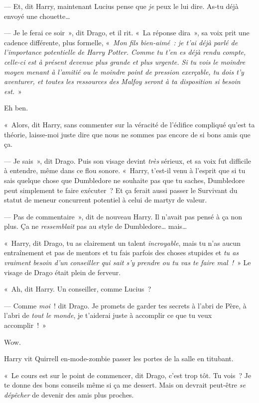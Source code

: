 --- Et, dit Harry, maintenant Lucius pense que \emph{je} peux le lui dire. As-tu déjà envoyé une chouette…

--- Je le ferai ce soir~», dit Drago, et il rit. «~La réponse dira~», sa voix prit une cadence différente, plus formelle, «~\emph{Mon fils bien-aimé~: je t'ai déjà parlé de l'importance potentielle de Harry Potter. Comme tu t'en es déjà rendu compte, celle-ci est à présent devenue plus grande et plus urgente. Si tu vois le moindre moyen menant à l'amitié ou le moindre point de pression exerçable, tu dois t'y aventurer, et toutes les ressources des Malfoy seront à ta disposition si besoin est.}~»

Eh ben.

«~Alors, dit Harry, sans commenter sur la véracité de l'édifice compliqué qu'est ta théorie, laisse-moi juste dire que nous ne sommes pas encore de si bons amis que ça.

--- Je sais~», dit Drago. Puis son visage devint \emph{très} sérieux, et sa voix fut difficile à entendre, même dans ce flou sonore. «~Harry, t'est-il venu à l'esprit que si tu sais quelque chose que Dumbledore ne souhaite pas que tu saches, Dumbledore peut simplement te faire exécuter~? Et ça ferait aussi passer le Survivant du statut de meneur concurrent potentiel à celui de martyr de valeur.

--- Pas de commentaire~», dit de nouveau Harry. Il n'avait pas pensé à ça non plus. Ça ne \emph{ressemblait} pas au style de Dumbledore… mais…

«~Harry, dit Drago, tu as clairement un talent \emph{incroyable}, mais tu n'as aucun entraînement et pas de mentors et tu fais parfois des choses stupides et \emph{tu as vraiment besoin d'un conseiller qui sait s'y prendre ou tu vas te faire mal~!}~» Le visage de Drago était plein de ferveur.

«~Ah, dit Harry. Un conseiller, comme Lucius~?

--- Comme \emph{moi}~! dit Drago. Je promets de garder tes secrets à l'abri de Père, à l'abri de \emph{tout le monde}, je t'aiderai juste à accomplir ce que tu veux accomplir~!~»

Wow.

Harry vit Quirrell en-mode-zombie passer les portes de la salle en titubant.

«~Le cours est sur le point de commencer, dit Drago, c'est trop tôt. Tu vois~? Je te donne des bons conseils même si ça me dessert. Mais on devrait peut-être \emph{se dépêcher} de devenir des amis plus proches.

